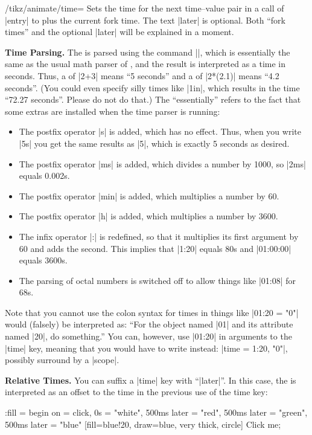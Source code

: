 \begin{key}{/tikz/animate/time=}
    Sets the time for the next time--value pair in a call of |entry| to
     plus the current fork time. The text |later| is optional. Both
    ``fork times'' and the optional |later| will be explained in a moment.

    \medskip\textbf{Time Parsing.}
    The  is parsed using the command |\pgfparsetime|, which is
    essentially the same as the usual math parser of \tikzname, and the result
    is interpreted as a time in seconds. Thus, a  of |2+3| means ``5
    seconds'' and a  of |2*(2.1)| means ``4.2 seconds''. (You could
    even specify silly times like |1in|, which results in the time ``72.27
    seconds''. Please do not do that.) The ``essentially''  refers to the fact
    that some extras are installed when the time parser is running:
    \begin{itemize}
        \item The postfix operator |s| is added, which has no effect. Thus,
            when you write |5s| you get the same results as |5|, which is
            exactly 5 seconds as desired.
        \item The postfix operator |ms| is added, which divides a number by
            1000, so |2ms| equals 0.002s.
        \item The postfix operator |min| is added, which multiplies a number by
            60.
        \item The postfix operator |h| is added, which multiplies a number by
            3600.
        \item The infix operator |:| is redefined, so that it multiplies its
            first argument by 60 and adds the second. This implies that |1:20|
            equals 80s and |01:00:00| equals 3600s.
        \item The parsing of octal numbers is switched off to allow things like
            |01:08| for 68s.
    \end{itemize}

    Note that you cannot use the colon syntax for times in things like
    |01:20 = "0"| would (falsely) be interpreted as: ``For the object named |01|
    and its attribute named |20|, do something.'' You can, however, use |01:20|
    in arguments to the |time| key, meaning that you would have to write
    instead: |time = 1:20, "0"|, possibly surround by a |scope|.

    \medskip\textbf{Relative Times.}
    You can suffix a |time| key with ``|later|''. In this case, the 
    is interpreted as an offset to the time in the previous use of the time
    key:
\begin{codeexample}[imagesource={standalone/pgfmanual-en-tikz-animations-animation-13.svg}]
\tikz \node :fill = { begin on = click,
    0s = "white",
    500ms later = "red",
    500ms later = "green",  %
    500ms later = "blue"} %
  [fill=blue!20, draw=blue, very thick, circle] {Click me};
\end{codeexample}


\end{key}
